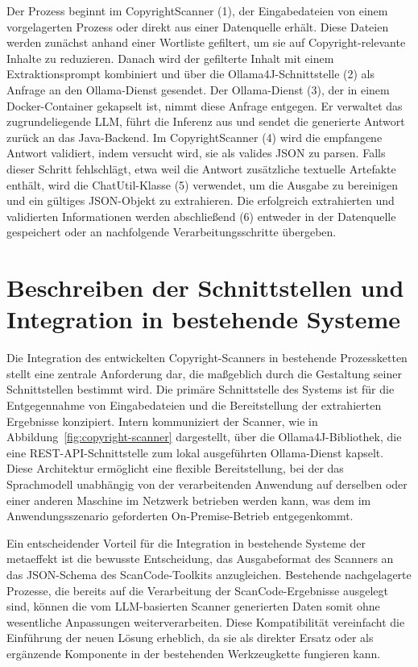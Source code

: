 Der Prozess beginnt im CopyrightScanner (1), der Eingabedateien von einem vorgelagerten Prozess oder direkt aus einer Datenquelle erhält.
Diese Dateien werden zunächst anhand einer Wortliste gefiltert, um sie auf Copyright-relevante Inhalte zu reduzieren.
Danach wird der gefilterte Inhalt mit einem Extraktionsprompt kombiniert und über die Ollama4J-Schnittstelle (2) als Anfrage an den Ollama-Dienst gesendet.
Der Ollama-Dienst (3), der in einem Docker-Container gekapselt ist, nimmt diese Anfrage entgegen.
Er verwaltet das zugrundeliegende LLM, führt die Inferenz aus und sendet die generierte Antwort zurück an das Java-Backend.
Im CopyrightScanner (4) wird die empfangene Antwort validiert, indem versucht wird, sie als valides JSON zu parsen.
Falls dieser Schritt fehlschlägt, etwa weil die Antwort zusätzliche textuelle Artefakte enthält, wird die ChatUtil-Klasse (5) verwendet, um die Ausgabe zu bereinigen und ein gültiges JSON-Objekt zu extrahieren.
Die erfolgreich extrahierten und validierten Informationen werden abschließend (6) entweder in der Datenquelle gespeichert oder an nachfolgende Verarbeitungsschritte übergeben.


\section{Beschreiben der Schnittstellen und Integration in bestehende Systeme}

Die Integration des entwickelten Copyright-Scanners in bestehende Prozessketten stellt eine zentrale Anforderung dar, die maßgeblich durch die Gestaltung seiner Schnittstellen bestimmt wird.
Die primäre Schnittstelle des Systems ist für die Entgegennahme von Eingabedateien und die Bereitstellung der extrahierten Ergebnisse konzipiert.
Intern kommuniziert der Scanner, wie in Abbildung~\ref{fig:copyright-scanner} dargestellt, über die Ollama4J-Bibliothek, die eine REST-API-Schnittstelle zum lokal ausgeführten Ollama-Dienst kapselt.
Diese Architektur ermöglicht eine flexible Bereitstellung, bei der das Sprachmodell unabhängig von der verarbeitenden Anwendung auf derselben oder einer anderen Maschine im Netzwerk betrieben werden kann, was dem im Anwendungsszenario geforderten On-Premise-Betrieb entgegenkommt.

Ein entscheidender Vorteil für die Integration in bestehende Systeme der metaeffekt ist die bewusste Entscheidung, das Ausgabeformat des Scanners an das JSON-Schema des ScanCode-Toolkits anzugleichen.
Bestehende nachgelagerte Prozesse, die bereits auf die Verarbeitung der ScanCode-Ergebnisse ausgelegt sind, können die vom LLM-basierten Scanner generierten Daten somit ohne wesentliche Anpassungen weiterverarbeiten.
Diese Kompatibilität vereinfacht die Einführung der neuen Lösung erheblich, da sie als direkter Ersatz oder als ergänzende Komponente in der bestehenden Werkzeugkette fungieren kann.

